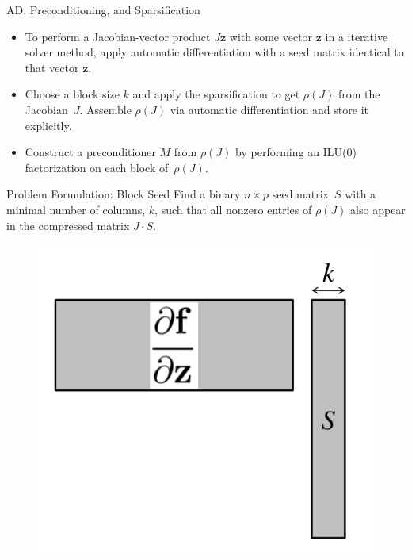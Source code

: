 \documentclass{beamer}
\newcommand{\vek}[1]{{\ensuremath{\mathbf #1}}}
\newcommand{\sparsifysymbol}{\ensuremath{\rho}}
\newcommand{\sparsify}[1]{\ensuremath{\sparsifysymbol(#1)}}
\begin{document}
\begin{frame}{AD, Preconditioning, and Sparsification}
\begin{itemize}
  \item To perform a Jacobian-vector product $J \vek{z}$ with some vector \vek{z} in a
      iterative solver method, apply automatic differentiation with a seed matrix
      identical to that vector \vek{z}. 
  \item Choose a block size $k$ and apply the sparsification to get \sparsify{J} from
      the Jacobian~$J$. Assemble \sparsify{J} via automatic differentiation and store
      it explicitly.
  \item Construct a preconditioner $M$ from \sparsify{J} by performing an ILU(0)
      factorization on each block of~\sparsify{J}. 
\end{itemize}
\end{frame}


\begin{frame}{Problem Formulation: Block Seed}
Find a binary $n \times p$ seed matrix~$S$ with a minimal number of columns, $k$, such
that all nonzero entries of \sparsify{J} also appear in the compressed matrix $J \cdot S$.

\begin{figure}
\includegraphics[width=0.5\linewidth]{minimizek}
\end{figure}
\end{frame}
\end{document}
